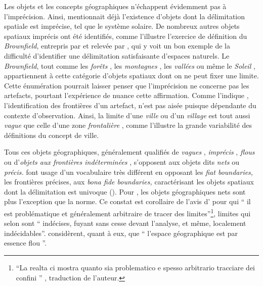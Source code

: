 Les objets et les concepts géographiques n’échappent évidemment pas à
l’imprécision. Ainsi, \textcite{Russell1923} mentionnait déjà
l’existence d’objets dont la délimitation spatiale est imprécise, tel
que le système solaire. De nombreux autres objets spatiaux imprécis
ont été identifiés, comme l’illustre l’exercice de définition du
\emph{Brownfield}, entrepris par \textcite{Alker2000} et relevée par
\textcite{Bennett2001}, qui y voit un bon exemple de la difficulté
d’identifier une délimitation satisfaisante d’espaces naturels. Le
\emph{Brownfield}, tout comme les \emph{forêts}
\autocite{Bennett2001,Dilo2006,Fisher2006}, les \emph{montagnes}
\autocite{Varzi2001,Fisher2006,Chaudhry2008}, les \emph{vallées}
\autocite{Schneider2003} ou même le \emph{Soleil}
\autocite{Simons1999}, appartiennent à cette catégorie d’objets
spatiaux dont on ne peut fixer une limite. Cette énumération pourrait
laisser penser que l’imprécision ne concerne pas les artefacts,
pourtant l’expérience de  nuance cette affirmation. Comme
l’indique \textcite{Campari1996}, l’identification des frontières d’un
artefact, n’est pas aisée puisque dépendante du contexte
d’observation. Ainsi, la limite d’une \emph{ville} ou d’un
\emph{village} est tout aussi \emph{vague} que celle d’une zone
\emph{frontalière} \autocite{Varzi2001,Fisher2006}, comme l’illustre
la grande variabilité des définitions du concept de ville.

Tous ces objets géographiques, généralement qualifiés de \emph{vagues}
\autocite{Erwig1997}, \emph{imprécis} \autocite{Winter2000},
\emph{flous} \autocite{Lagacherie1996} ou d’\emph{objets aux
  frontières indéterminées} \autocite{Burrough1996}, s’opposent aux
objets dits \emph{nets} \autocite{Schneider2001} ou \emph{précis.}
\textcite{Smith2000} font usage d’un vocabulaire très différent en
opposant les \emph{fiat boundaries,} \ie les frontières précises, aux
\emph{bona fide boundaries,} caractérisant les objets spatiaux dont la
délimitation est univoque (). Pour
\textcite{Couclelis1996}, les objets géographiques nets sont plus
l’exception que la norme. Ce constat est corollaire de l’avis d’
\textcite{OddAmbrosetti1987} pour qui \enquote{\textelp{} il est
  problématique et généralement arbitraire de tracer des
  limites\textelp{}}\footnote{\foreignquote{italian}{La realta ci
    mostra quanto sia problematico e spesso arbitrario tracciare dei
    confini \textelp{}} \autocite[200]{OddAmbrosetti1987}, traduction
  de l’auteur.}, limites qui selon \textcite[106]{Brunet2001} sont
\enquote{\textelp{} indécises, fuyant sans cesse devant l’analyse, et
  même, localement indécidables}. \textcite{Dutozia1994} considèrent,
quant à eux, que \enquote{\textelp{} l’espace géographique est par
  essence flou \textelp{}}.

